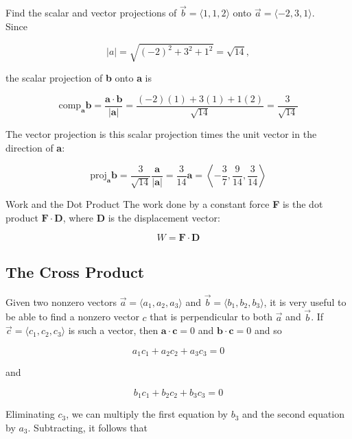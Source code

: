         \textit{} Find the scalar and vector projections of $\vec{b} = \langle 1, 1, 2 \rangle$ onto $\vec{a} = \langle -2, 3, 1\rangle$. \\

        Since

        \[
            |a| = \sqrt{(-2)^2 + 3^2 + 1^2} = \sqrt{14},
        \]

        the scalar projection of \textbf{b} onto \textbf{a} is

        \[
            \text{comp}_{\mathbf{a}} \mathbf{b = \frac{a\cdot b}{|a|}} = \frac{(-2)(1) + 3(1) + 1(2)}{\sqrt{14}} = \frac{3}{\sqrt{14}}
        \]

        The vector projection is this scalar projection times the unit vector in the direction of \textbf{a}:

        \[
            \text{proj}_{\mathbf{a}} \mathbf{b} = \frac{3}{\sqrt{14}}\mathbf{\frac{a}{|a|}} = \frac{3}{14}\mathbf{a} = \left\langle -\frac{3}{7}, \frac{9}{14}, \frac{3}{14}\right\rangle
        \]

        \begin{axiom}{Work and the Dot Product}
            The work done by a constant force \textbf{F} is the dot product $\mathbf{F\cdot D}$, where \textbf{D} is the displacement vector:

            \[
                W = \mathbf{F \cdot D}
            \]
        \end{axiom}

    \subsection{The Cross Product}      %

        Given two nonzero vectors $\vec{a} = \langle a_1, a_2, a_3\rangle$ and $\vec{b} = \langle b_1, b_2, b_3\rangle$, it is very useful to be able to find a nonzero vector $c$ that is perpendicular to both $\vec{a}$
        and $\vec{b}$. If $\vec{c} = \langle c_1, c_2, c_3\rangle$ is such a vector, then $\mathbf{a\cdot c} = 0$ and $\mathbf{b\cdot c} = 0$ and so

        \[
            a_1 c_1 + a_2 c_2 + a_3 c_3 = 0
        \]

        and

        \[
            b_1 c_1 + b_2 c_2 + b_3 c_3 = 0
        \]

        Eliminating $c_3$, we can multiply the first equation by $b_3$ and the second equation by $a_3$. Subtracting, it follows that

